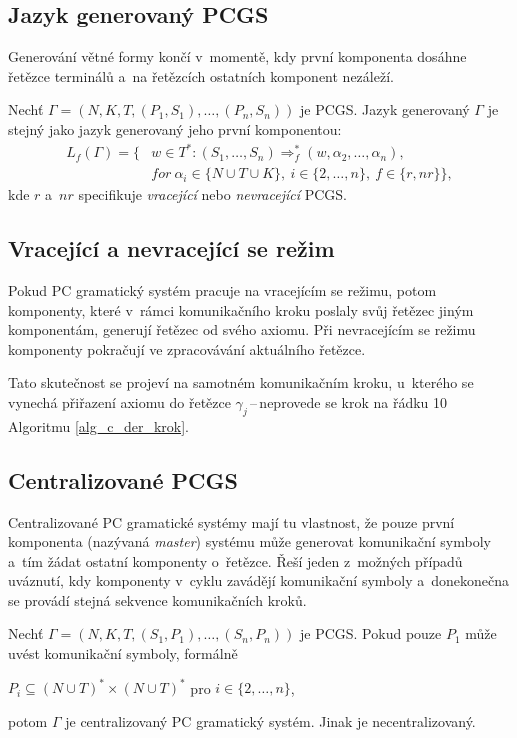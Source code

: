 \subsection*{Jazyk generovaný PCGS}\label{def_gener_jazyk_pcgs}
Generování větné formy končí v~momentě, kdy první komponenta dosáhne řetězce terminálů a~na řetězcích ostatních komponent nezáleží.
\begin{definition}
    Nechť $\Gamma = (N, K, T, (P_1, S_1), \ldots, (P_n, S_n))$ je PCGS.
    Jazyk generovaný $\Gamma$ je stejný jako jazyk generovaný jeho první komponentou:
    \begin{align*}
        L_f(\Gamma) = \{&w \in T^*: (S_1, \ldots, S_n) \Rightarrow^*_f (w, \alpha_2, \ldots, \alpha_n),\\ 
        &for\ \alpha_i \in \{N \cup T \cup K\},\ i \in \{2, \ldots, n\},\ f \in \{r, nr\}\},
    \end{align*}
    kde $r$ a~$nr$ specifikuje \emph{vracející} nebo \emph{nevracející} PCGS.
\end{definition}

\subsection*{Vracející a nevracející se režim}
Pokud PC gramatický systém pracuje na vracejícím se režimu, potom komponenty, které v~rámci komunikačního kroku poslaly svůj řetězec jiným komponentám, generují řetězec od svého axiomu.
Při nevracejícím se režimu komponenty pokračují ve zpracovávání aktuálního řetězce.

Tato skutečnost se projeví na samotném komunikačním kroku, u~kterého se vynechá přiřazení axiomu do řetězce $\gamma_j$\,--\,neprovede se krok na řádku 10 Algoritmu \ref{alg_c_der_krok}.

\subsection*{Centralizované PCGS}
Centralizované PC gramatické systémy mají tu vlastnost, že pouze první komponenta (nazývaná \emph{master}) systému může generovat komunikační symboly a~tím žádat ostatní komponenty o~řetězce.
Řeší jeden z~možných případů uváznutí, kdy komponenty v~cyklu zavádějí komunikační symboly a~donekonečna se provádí stejná sekvence komunikačních kroků. 

\begin{definition}
    Nechť $\Gamma = (N, K, T, (S_1, P_1), \ldots, (S_n, P_n))$ je PCGS.
    Pokud pouze $P_1$ může uvést komunikační symboly, formálně
    \begin{center}
        $P_i \subseteq (N \cup T)^* \times (N \cup T)^*$ pro $i \in \{2, \ldots, n\}$,
    \end{center}
    potom $\Gamma$ je centralizovaný PC gramatický systém.
    Jinak je necentralizovaný.
\end{definition}

